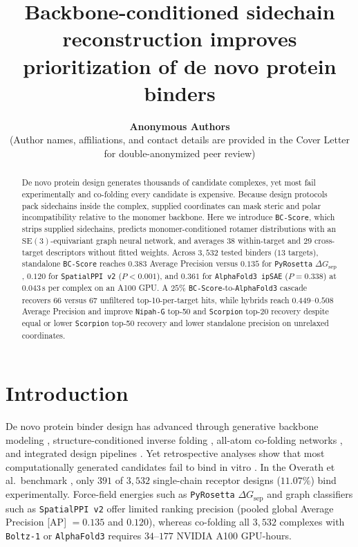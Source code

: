 \documentclass[10pt,twocolumn]{article}
\title{\vspace{-1.2em}\textbf{Backbone-conditioned sidechain reconstruction improves prioritization of de novo protein binders}}
\author{
  \textbf{Anonymous Authors}\\
  \small (Author names, affiliations, and contact details are provided in the Cover Letter for double-anonymized peer review)
}
\date{}
\begin{document}
\raggedbottom

\maketitle

\begin{abstract}
\noindent
De novo protein design generates thousands of candidate complexes, yet most fail experimentally and co-folding every candidate is expensive. Because design protocols pack sidechains inside the complex, supplied coordinates can mask steric and polar incompatibility relative to the monomer backbone. Here we introduce \texttt{BC-Score}, which strips supplied sidechains, predicts monomer-conditioned rotamer distributions with an $\text{SE}(3)$-equivariant graph neural network, and averages $38$ within-target and $29$ cross-target descriptors without fitted weights. Across $3,532$ tested binders ($13$ targets), standalone \texttt{BC-Score} reaches $0.383$ Average Precision versus $0.135$ for \texttt{PyRosetta} $\Delta G_{\text{sep}}$, $0.120$ for \texttt{SpatialPPI v2} ($P < 0.001$), and $0.361$ for \texttt{AlphaFold3 ipSAE} ($P = 0.338$) at $0.043\,\text{s}$ per complex on an A100 GPU. A $25\%$ \texttt{BC-Score}-to-\texttt{AlphaFold3} cascade recovers $66$ versus $67$ unfiltered top-10-per-target hits, while hybrids reach $0.449\text{--}0.508$ Average Precision and improve \texttt{Nipah-G} top-50 and \texttt{Scorpion} top-20 recovery despite equal or lower \texttt{Scorpion} top-50 recovery and lower standalone precision on unrelaxed coordinates.
\end{abstract}

\section{Introduction}
De novo protein binder design has advanced through generative backbone modeling \cite{watson2023de,gainza2023de}, structure-conditioned inverse folding \cite{ingraham2019generative,dauparas2022robust,hsu2022esmif1,jing2021gvp}, all-atom co-folding networks \cite{jumper2021highly,evans2021afmultimer,mirdita2022colabfold,abramson2024accurate,wohlwend2024boltz1,passaro2025boltz2,bytedance2025protenix,chaidiscovery2024chai1}, and integrated design pipelines \cite{pacesa2024bindcraft,stark2025boltzgen}. Yet retrospective analyses show that most computationally generated candidates fail to bind in vitro \cite{cao2022design,bennett2023improving,overath2025predicting}. In the Overath et al.\ benchmark \cite{overath2025predicting}, only $391$ of $3,532$ single-chain receptor designs ($11.07\%$) bind experimentally. Force-field energies such as \texttt{PyRosetta} $\Delta G_{\text{sep}}$ \cite{leaverfay2011rosetta3,chaudhury2010pyrosetta,alfort2017rosetta} and graph classifiers such as \texttt{SpatialPPI v2} \cite{spatialppi2} offer limited ranking precision (pooled global Average Precision [AP] $= 0.135$ and $0.120$), whereas co-folding all $3,532$ complexes with \texttt{Boltz-1} \cite{wohlwend2024boltz1} or \texttt{AlphaFold3} \cite{abramson2024accurate} requires $34\text{--}177$ NVIDIA A100 GPU-hours.
\end{document}
